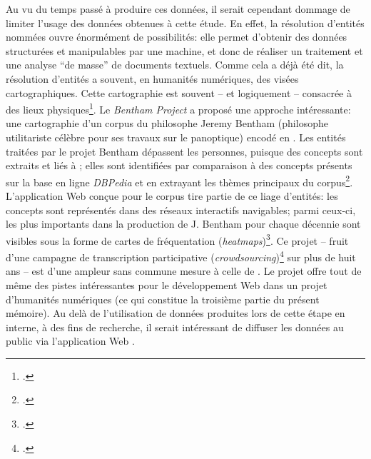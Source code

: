 Au vu du temps passé à produire ces données, il serait cependant dommage de limiter l'usage des données obtenues à cette étude. En effet, la résolution d'entités nommées ouvre énormément de possibilités: elle permet d'obtenir des données structurées et manipulables par une machine, et donc de réaliser un traitement et une analyse \enquote{de masse} de documents textuels. Comme cela a déjà été dit, la résolution d'entités a souvent, en humanités numériques, des visées cartographiques. Cette cartographie est souvent -- et logiquement -- consacrée à des lieux physiques\footcite{soudani_adaptation_2018, frontini_annotation_2016, boeglin_pour_2016}. Le \textit{Bentham Project} a proposé une approche intéressante: une cartographie d'un corpus du philosophe Jeremy Bentham (philosophe utilitariste célèbre pour ses travaux sur le panoptique) encodé en \xmltei{}. Les entités traitées par le projet Bentham dépassent les personnes, puisque des concepts sont extraits et liés à \wkd{}; elles sont identifiées par comparaison à des concepts présents sur la base en ligne \textit{DBPedia} et en extrayant les thèmes principaux du corpus\footcite[p. 8-11]{ruiz_fabo_mapping_2019}. L'application Web conçue pour le corpus tire partie de ce liage d'entités: les concepts sont représentés dans des réseaux interactifs navigables; parmi ceux-ci, les plus importants dans la production de J. Bentham pour chaque décennie sont visibles sous la forme de cartes de fréquentation (\textit{heatmaps})\footcite[p.14-17]{ruiz_fabo_mapping_2019}. Ce projet -- fruit d'une campagne de transcription participative (\textit{crowdsourcing})\footcite[p. 2]{ruiz_fabo_mapping_2019} sur plus de huit ans -- est d'une ampleur sans commune mesure à celle de \mssktb{}. Le projet offre tout de même des pistes intéressantes pour le développement Web dans un projet d'humanités numériques (ce qui constitue la troisième partie du présent mémoire). Au delà de l'utilisation de données produites lors de cette étape en interne, à des fins de recherche, il serait intéressant de diffuser les données au public via l'application Web \ktb{}. 

